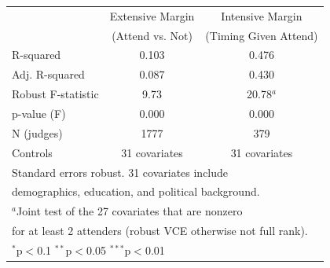 \begin{tabular}{lcc}
\toprule
 & Extensive Margin & Intensive Margin \\
 & (Attend vs. Not) & (Timing Given Attend) \\
\midrule
R-squared & 0.103 & 0.476 \\
Adj. R-squared & 0.087 & 0.430 \\
Robust F-statistic & 9.73 & 20.78\(^{a}\) \\
p-value (F) & 0.000 & 0.000 \\
N (judges) & 1777 & 379 \\
Controls & 31 covariates & 31 covariates \\
\bottomrule
\multicolumn{3}{l}{\footnotesize Standard errors robust. 31 covariates include} \\
\multicolumn{3}{l}{\footnotesize demographics, education, and political background.} \\
\multicolumn{3}{l}{\footnotesize \(^{a}\)Joint test of the 27 covariates that are nonzero} \\
\multicolumn{3}{l}{\footnotesize for at least 2 attenders (robust VCE otherwise not full rank).} \\
\multicolumn{3}{l}{\footnotesize \(^{*}\)p\(<\)0.1 \(^{**}\)p\(<\)0.05 \(^{***}\)p\(<\)0.01} \\
\end{tabular}
